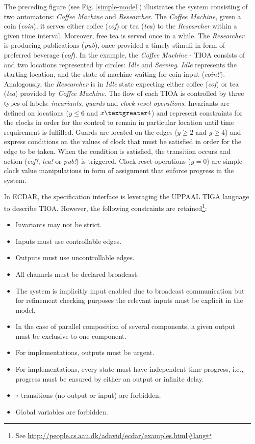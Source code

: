The preceding figure (see Fig. \ref{simple-model}) illustrates the system
consisting of two automatons: \emph{Coffee Machine} and \emph{Researcher}.  The
\emph{Coffee Machine}, given a coin (\emph{coin}), it serves either coffee
(\emph{cof}) or tea (\emph{tea}) to the \emph{Researcher} within a given time
interval. Moreover, free tea is served once in a while. The \emph{Researcher} is
producing publications (\emph{pub}), once provided a timely stimuli in form of
preferred beverage (\emph{cof}).  In the example, the \emph{Coffee Machine} -
TIOA consists of and two locations represented by circles: \emph{Idle} and
\emph{Serving}. \emph{Idle} represents the starting location, and the state of
machine waiting for coin input (\emph{coin?}). Analogously, the
\emph{Researcher} is in \emph{Idle} state expecting either coffee (\emph{cof})
or tea (\emph{tea}) provided by \emph{Coffee Machine}.  The flow of each TIOA is
controlled by three types of labels: \emph{invariants}, \emph{guards} and
\emph{clock-reset operations}.  Invariants are defined on locations ($y\leq 6$
and $x\textgreater 4$) and represent constraints for the clocks in order for the
control to remain in particular location until time requirement is fulfilled.
Guards are located on the edges ($y\geq 2$ and $y\geq 4$) and express conditions
on the values of clock that must be satisfied in order for the edge to be
taken. When the condition is satisfied, the transition occurs and action
(\emph{cof!}, \emph{tea!} or \emph{pub!}) is triggered. Clock-reset operations
($y=0$) are simple clock value manipulations in form of assignment that enforce
progress in the system.

In ECDAR, the specification interface is leveraging the UPPAAL TIGA language
\cite{behrmann_uppaal-tiga:_2006} to describe TIOA. However, the following
constraints are retained\footnote{See
  \url{http://people.cs.aau.dk/adavid/ecdar/examples.html#lang}}:


\begin{itemize}
\item Invariants may not be strict.
\item Inputs must use controllable edges.
\item Outputs must use uncontrollable edges.
\item All channels must be declared broadcast.
\item The system is implicitly input enabled due to broadcast communication but
  for refinement checking purposes the relevant inputs must be explicit in the
  model.
\item In the case of parallel composition of several components, a given output
  must be exclusive to one component.
\item For implementations, outputs must be urgent.
\item For implementations, every state must have independent time progress,
  i.e., progress must be ensured by either an output or infinite delay.
\item $\tau$-transitions (no output or input) are forbidden.
\item Global variables are forbidden.
\end{itemize}

